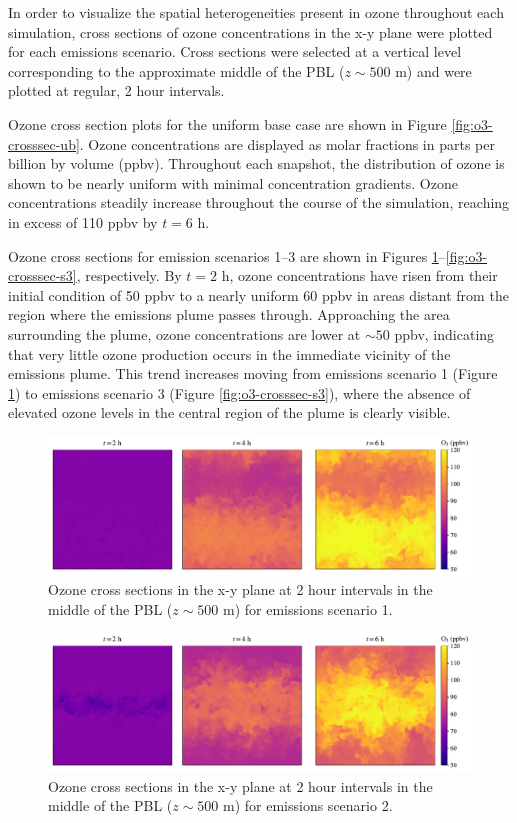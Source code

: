 In order to visualize the spatial heterogeneities present in ozone throughout each simulation, cross sections of ozone concentrations in the x-y plane were plotted for each emissions scenario. Cross sections were selected at a vertical level corresponding to the approximate middle of the PBL ($z\sim500$ \si{m}) and were plotted at regular, 2 hour intervals. 

Ozone cross section plots for the uniform base case are shown in Figure \ref{fig:o3-crosssec-ub}. Ozone concentrations are displayed as molar fractions in parts per billion by volume (ppbv). Throughout each snapshot, the distribution of ozone is shown to be nearly uniform with minimal concentration gradients. Ozone concentrations steadily increase throughout the course of the simulation, reaching in excess of 110 ppbv by $t=6$ h.

Ozone cross sections for emission scenarios 1--3 are shown in Figures \ref{fig:o3-crosssec-s1}--\ref{fig:o3-crosssec-s3}, respectively. By $t=2$ h, ozone concentrations have risen from their initial condition of 50 \si{ppbv} to a nearly uniform 60 \si{ppbv} in areas distant from the region where the emissions plume passes through. Approaching the area surrounding the plume, ozone concentrations are lower at  $\sim50$ \si{ppbv}, indicating that very little ozone production occurs in the immediate vicinity of the emissions plume. This trend increases moving from emissions scenario 1 (Figure \ref{fig:o3-crosssec-s1}) to emissions scenario 3 (Figure \ref{fig:o3-crosssec-s3}), where the absence of elevated ozone levels in the central region of the plume is clearly visible. 

\begin{figure}[h]
    \centering
    \includegraphics[width=.9\textwidth]{figures/chapter4/o3-crosssec-fx1fy0-z25.pdf}
    \caption{Ozone cross sections in the x-y plane at 2 hour intervals in the middle of the PBL ($z\sim500$ \si{m}) for emissions scenario 1.}
    \label{fig:o3-crosssec-s1}
\end{figure}

\begin{figure}[h]
    \centering
    \includegraphics[width=.9\textwidth]{figures/chapter4/o3-crosssec-road-10x-z25.pdf}
    \caption{Ozone cross sections in the x-y plane at 2 hour intervals in the middle of the PBL ($z\sim500$ \si{m}) for emissions scenario 2.}
    \label{fig:o3-crosssec-s2}
\end{figure}

